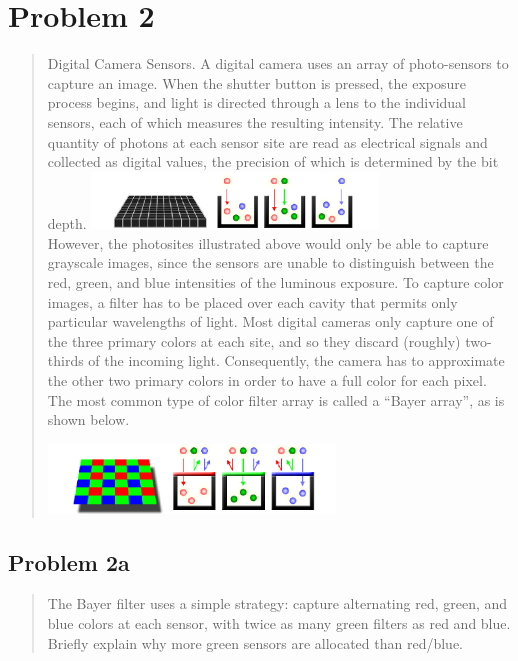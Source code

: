 \documentclass[10pt,a4paper]{article}
\let\oldsubsection\subsection
\renewcommand{\subsection}{%
    \setcounter{equation}{0}%
    \oldsubsection%
}
\begin{document}
\section{Problem 2}
\begin{quote}
Digital Camera Sensors. A digital camera uses an array of photo-sensors to capture an image. When the
shutter button is pressed, the exposure process begins, and light is directed through a lens to the individual
sensors, each of which measures the resulting intensity. The relative quantity of photons at each sensor site are
read as electrical signals and collected as digital values, the precision of which is determined by the bit depth.
\includegraphics[width=3in]{images/Problem2-1.png} \\

However, the photosites illustrated above would only be able to capture grayscale images, since the sensors are
unable to distinguish between the red, green, and blue intensities of the luminous exposure. To capture color
images, a filter has to be placed over each cavity that permits only particular wavelengths of light. Most digital
cameras only capture one of the three primary colors at each site, and so they discard (roughly) two-thirds of
the incoming light. Consequently, the camera has to approximate the other two primary colors in order to have
a full color for each pixel. The most common type of color filter array is called a “Bayer array”, as is shown
below.

\includegraphics[width=3in]{images/Problem2-2.png} \\

\end{quote}



\subsection{Problem 2a}
\begin{quote}
The Bayer filter uses a simple strategy: capture alternating red, green, and blue colors at each sensor, with twice
as many green filters as red and blue. Briefly explain why more green sensors are allocated than red/blue.
\end{quote}
\end{document}
